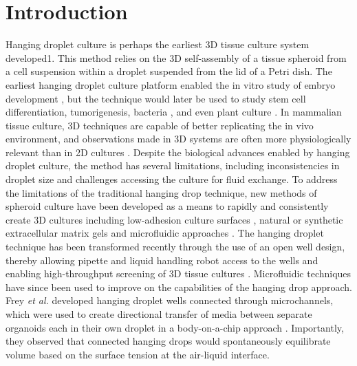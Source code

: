 \section{Introduction}
Hanging droplet culture is perhaps the earliest 3D tissue culture system developed1. This method relies on the 3D self-assembly of a tissue spheroid from a cell suspension within a droplet suspended from the lid of a Petri dish. The earliest hanging droplet culture platform enabled the in vitro study of embryo development \cite{Harrison1910}, but the technique would later be used to study stem cell differentiation, tumorigenesis, bacteria \cite{Tittsler1936}, and even plant culture \cite{Muir1958}. In mammalian tissue culture, 3D techniques are capable of better replicating the in vivo environment, and observations made in 3D systems are often more physiologically relevant than in 2D cultures \cite{Abbott2003, Stegemann2003, Debnath2005, Folkman1973}. Despite the biological advances enabled by hanging droplet culture, the method has several limitations, including inconsistencies in droplet size and challenges accessing the culture for fluid exchange. To address the limitations of the traditional hanging drop technique, new methods of spheroid culture have been developed as a means to rapidly and consistently create 3D cultures including low-adhesion culture surfaces \cite{Turner2014}, natural or synthetic extracellular matrix gels \cite{Debnath2005, Karthaus2014, Lee2012} and microfluidic approaches \cite{Hsiao2009, Wu2008}. The hanging droplet technique has been transformed recently through the use of an open well design, thereby allowing pipette and liquid handling robot access to the wells and enabling high-throughput screening of 3D tissue cultures \cite{Tung2011}. Microfluidic techniques have since been used to improve on the capabilities of the hanging drop approach. Frey \textit{et al.}  developed hanging droplet wells connected through microchannels, which were used to create directional transfer of media between separate organoids each in their own droplet in a body-on-a-chip approach \cite{Frey2014}. Importantly, they observed that connected hanging drops would spontaneously equilibrate volume based on the surface tension at the air-liquid interface.

